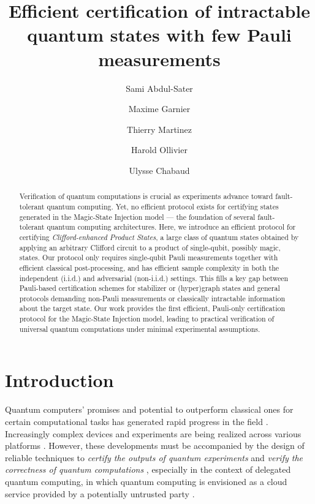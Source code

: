 \documentclass[a4paper,twocolumn,11pt,unpublished]{quantumarticle}
\title{Efficient certification of intractable quantum states with few Pauli measurements}
\author{Sami Abdul-Sater}
\author{Maxime Garnier}
\author{Thierry Martinez}
\author{Harold Ollivier}
\author{Ulysse Chabaud}
\affiliation{INRIA, DIENS, Ecole Normale Supérieure, PSL University, CNRS, 45 rue d’Ulm, Paris 75005, France}
\begin{document}
\begin{abstract}
    Verification of quantum computations is crucial as experiments advance toward fault-tolerant quantum computing. Yet, no efficient protocol exists for certifying states generated in the Magic-State Injection model — the foundation of several fault-tolerant quantum computing architectures.
    Here, we introduce an efficient protocol for certifying \textit{Clifford-enhanced Product States}, a large class of quantum states obtained by applying an arbitrary Clifford circuit to a product of single-qubit, possibly magic, states.
    Our protocol only requires single-qubit Pauli measurements together with efficient classical post-processing, and has efficient sample complexity in both the independent (i.i.d.) and adversarial (non-i.i.d.) settings.
This fills a key gap between Pauli-based certification schemes for stabilizer or (hyper)graph states and general protocols demanding non-Pauli measurements or classically intractable information about the target state. 
    Our work provides the first efficient, Pauli-only certification protocol for the Magic-State Injection model, leading to practical verification of universal quantum computations under minimal experimental assumptions.
\end{abstract}


\maketitle


\section{Introduction}


Quantum computers' promises and potential to outperform classical ones for certain computational tasks \cite{S94algorithms, G96fast, F82simulating, F86quantum, D85quantum, HCMP25vast} has generated rapid progress in the field \cite{P18quantum, EP25mind}.
Increasingly complex devices and experiments are being realized across various platforms \cite{NLDC22beating, AAAA25constructive, DBMA25breaking}. 
However, these developments must be accompanied by the design of reliable techniques to \emph{certify the outputs of quantum experiments} and \emph{verify the correctness of quantum computations} \cite{EHWR20quantum, BPY25quantum, PYBB24benchmarking}, especially in the context of delegated quantum computing, in which quantum computing is envisioned as a cloud service provided by a potentially untrusted party \cite{GKK19verification}.
\end{document}
